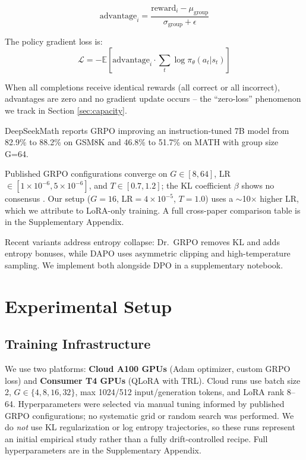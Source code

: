 \documentclass{article}
\begin{document}
\begin{equation}
    \text{advantage}_i = \frac{\text{reward}_i - \mu_{\text{group}}}{\sigma_{\text{group}} + \epsilon}
\end{equation}

The policy gradient loss is:
\begin{equation}
    \mathcal{L} = -\mathbb{E}\left[\text{advantage}_i \cdot \sum_t \log \pi_\theta(a_t | s_t)\right]
\end{equation}

When all completions receive identical rewards (all correct or all incorrect), advantages are zero and no gradient update occurs -- the ``zero-loss'' phenomenon we track in Section \ref{sec:capacity}.

DeepSeekMath reports GRPO improving an instruction-tuned 7B model from 82.9\% to 88.2\% on GSM8K and 46.8\% to 51.7\% on MATH with group size G=64.

Published GRPO configurations converge on $G \in [8, 64]$, LR $\in [1 \times 10^{-6}, 5 \times 10^{-6}]$, and $T \in [0.7, 1.2]$; the KL coefficient $\beta$ shows no consensus \citep{deepseekr1, shao2024deepseekmath}. Our setup ($G{=}16$, LR${}=4 \times 10^{-5}$, $T{=}1.0$) uses a $\sim$10$\times$ higher LR, which we attribute to LoRA-only training. A full cross-paper comparison table is in the Supplementary Appendix.

Recent variants address entropy collapse: Dr.\ GRPO \citep{deepseekr1} removes KL and adds entropy bonuses, while DAPO \citep{yu2025dapo} uses asymmetric clipping and high-temperature sampling. We implement both alongside DPO \citep{rafailov2024dpo} in a supplementary notebook.

\section{Experimental Setup}

\subsection{Training Infrastructure}

We use two platforms: \textbf{Cloud A100 GPUs} (Adam optimizer, custom GRPO loss) and \textbf{Consumer T4 GPUs} (QLoRA with TRL). Cloud runs use batch size 2, $G \in \{4, 8, 16, 32\}$, max 1024/512 input/generation tokens, and LoRA rank 8--64. Hyperparameters were selected via manual tuning informed by published GRPO configurations; no systematic grid or random search was performed. We do \emph{not} use KL regularization or log entropy trajectories, so these runs represent an initial empirical study rather than a fully drift-controlled recipe. Full hyperparameters are in the Supplementary Appendix.
\end{document}
